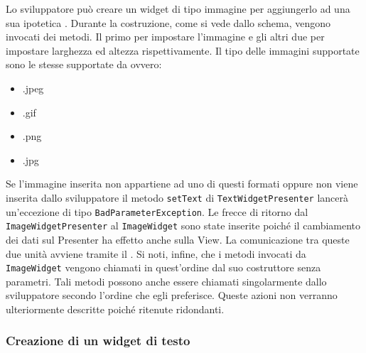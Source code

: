 Lo sviluppatore può creare un widget di tipo immagine per aggiungerlo ad una sua ipotetica . Durante la costruzione, come si vede dallo schema, vengono invocati dei metodi. Il primo per impostare l'immagine e gli altri due per impostare larghezza ed altezza rispettivamente. Il tipo delle immagini supportate sono le stesse supportate da  ovvero:
\begin{itemize}
\item .jpeg
\item .gif
\item .png
\item .jpg
\end{itemize}
Se l'immagine inserita non appartiene ad uno di questi formati oppure non viene inserita dallo sviluppatore il metodo \texttt{setText} di \texttt{TextWidgetPresenter} lancerà un'eccezione di tipo \texttt{BadParameterException}.
Le frecce di ritorno dal \texttt{ImageWidgetPresenter} al \texttt{ImageWidget} sono state inserite poiché il cambiamento dei dati sul Presenter ha effetto anche sulla View. La comunicazione tra queste due unità avviene tramite il  .
Si noti, infine, che i metodi invocati da \texttt{ImageWidget} vengono chiamati in quest'ordine dal suo costruttore senza parametri. Tali metodi possono anche essere chiamati singolarmente dallo sviluppatore secondo l'ordine che egli preferisce. Queste azioni non verranno ulteriormente descritte poiché ritenute ridondanti.

\newpage

\subsubsection{Creazione di un widget di testo}

